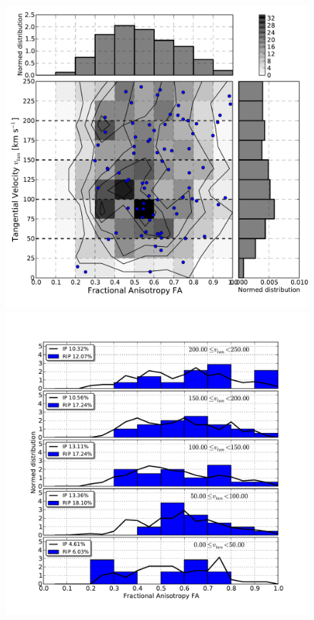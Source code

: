\documentclass[a4,useAMS,usenatbib,usegraphicx]{latex/mn2e}
\begin{document}
\begin{flushleft}
\begin{figure}
\begin{center}

  \includegraphics[trim = 2mm 9mm 3mm 4mm, clip, keepaspectratio=true,
  width=0.36\textheight]{./figures/2D_tangentialvelocity_FA_BDM_Tweb}
  \includegraphics[trim = 4mm 9mm 17mm 15mm, clip, keepaspectratio=true,
  width=0.36\textheight]{./figures/single_tangentialvelocity_FA_BDM_Tweb}
  

\end{center}
\end{figure}
\end{flushleft}
\end{document}
